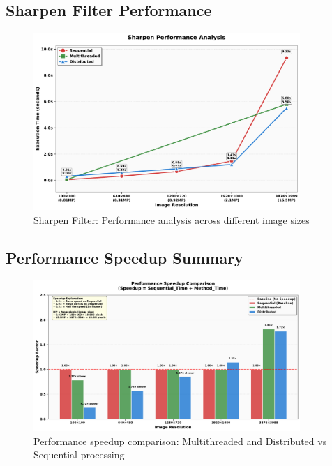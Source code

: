 \subsection{Sharpen Filter Performance}
\begin{figure}[htbp]
    \centering
    \includegraphics[width=0.9\textwidth]{graphs/sharpen_performance.pdf}
    \caption{Sharpen Filter: Performance analysis across different image sizes}
    \label{fig:sharpen_performance}
\end{figure}

\subsection{Performance Speedup Summary}
\begin{figure}[htbp]
    \centering
    \includegraphics[width=0.9\textwidth]{graphs/speedup_summary.pdf}
    \caption{Performance speedup comparison: Multithreaded and Distributed vs Sequential processing}
    \label{fig:speedup_summary}
\end{figure}
